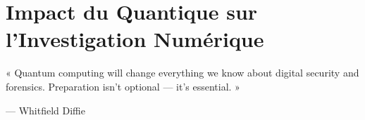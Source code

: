 
\chapter{Impact du Quantique sur l'Investigation Numérique}
\label{chap:quantique}

\epigraph{%
    « Quantum computing will change everything we know about digital
    security and forensics. Preparation isn't optional --- it's
    essential. »%
}{--- Whitfield Diffie}


